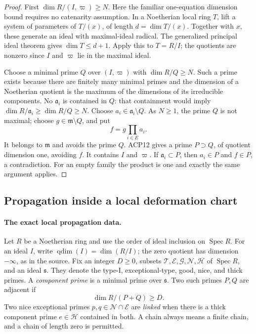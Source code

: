\documentclass[11pt,a4paper]{article}
\numberwithin{equation}{section}
\theoremstyle{remark}\newtheorem{remark}[theorem]{Remark}
\begin{document}
\begin{proof}
First
\(\dim R/(I,\varpi)\ge N\).
Here the familiar one-equation dimension bound requires no
catenarity assumption.  In a Noetherian local ring \(T\),
lift a system of parameters of \(T/(x)\), of length
\(d=\dim T/(x)\).  Together with \(x\), these generate an
ideal with maximal-ideal radical.  The generalized principal
ideal theorem gives \(\dim T\le d+1\).
Apply this to \(T=R/I\); the quotients are nonzero since
\(I\) and \(\varpi\) lie in the maximal ideal.

Choose a minimal prime \(Q\) over \((I,\varpi)\) with
\(\dim R/Q\ge N\).  Such a prime exists because there are
finitely many minimal primes and the dimension of a Noetherian
quotient is the maximum of the dimensions of its irreducible
components.  No \(\mathfrak a_i\) is contained in \(Q\):
that containment would imply
\(\dim R/\mathfrak a_i\ge\dim R/Q\ge N\).
Choose \(a_i\in\mathfrak a_i\setminus Q\).
As \(N\ge1\), the prime \(Q\) is not maximal; choose
\(g\in\mathfrak m\setminus Q\), and put
\[
                           f=g\prod_{i\in E}a_i.
\]
It belongs to \(\mathfrak m\) and avoids the prime \(Q\).
ACP12 gives a prime \(P\supset Q\), of quotient dimension
one, avoiding \(f\).  It contains \(I\) and \(\varpi\).
If \(\mathfrak a_i\subset P\), then \(a_i\in P\) and
\(f\in P\), a contradiction.  For an empty family the
product is one and exactly the same argument applies.
\end{proof}

\subsection{Propagation inside a local deformation chart}

\paragraph{The exact local propagation data.}
Let \(R\) be a Noetherian ring and use the order of ideal
inclusion on \(\operatorname{Spec}R\).  For an ideal \(I\),
write \(\operatorname{qdim}(I)=\dim(R/I)\); the zero quotient
has dimension \(-\infty\), as in the source.  Fix an integer
\(D\ge0\), subsets
\(\mathcal T,\mathcal E,\mathcal G,\mathcal N,\mathcal H\)
of \(\operatorname{Spec}R\), and an ideal \(\mathfrak s\).
They denote the type-I, exceptional-type, good, nice, and thick
primes.  A \emph{component prime} is a minimal prime over
\(\mathfrak s\).  Two such primes \(P,Q\) are adjacent if
\[
                         \dim R/(P+Q)\ge D.
                                                        \tag{ACP.25}
\]
Two nice exceptional primes \(p,q\in\mathcal N\cap\mathcal E\)
are \emph{linked} when there is a thick component prime
\(e\in\mathcal H\) contained in both.  A chain always means
a finite chain, and a chain of length zero is permitted.
\end{document}
